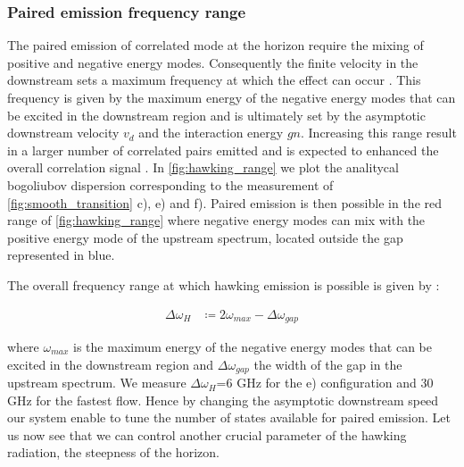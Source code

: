 \subsubsection{Paired emission frequency range}

The paired emission of correlated mode at the horizon require the mixing of positive and negative energy modes. Consequently the finite velocity in the downstream 
sets a maximum frequency at which the effect can occur \cite{jacquet_hawking_2019}. This frequency is given by the maximum energy of the negative energy modes that can be excited in the downstream region and is ultimately 
set by the asymptotic downstream velocity $v_d$ and the interaction energy $gn$. Increasing this range result in a larger number of correlated pairs emitted and is expected to enhanced
the overall correlation signal \cite{jacquet_hawking_2019}. 
In \autoref{fig:hawking_range} we plot the analitycal bogoliubov dispersion corresponding to the measurement of \autoref{fig:smooth_transition} c), e) and f).  Paired emission is then possible in the red range of \autoref{fig:hawking_range}  where negative energy modes
can mix with the positive energy mode of the upstream spectrum, located outside the gap represented in blue.

The overall frequency range at which hawking emission is possible is given by :

\begin{equation}
    \begin{align}
    \Delta \omega_H& \coloneqq  2\omega_{max}- \Delta\omega_{gap}
    \end{align}  
    \label{eq:hawking_range}
\end{equation}

where $\omega_{max}$ is the maximum energy of the negative energy modes that can be excited in the downstream region and $\Delta\omega_{gap}$ the width 
of the gap in the upstream spectrum. We measure $\Delta \omega_H$=6 GHz for the e) configuration and 30 GHz for the fastest flow. 
Hence by changing the asymptotic downstream speed our system enable to tune the number of states available for paired emission. Let us now 
see that we can control another crucial parameter of the hawking radiation, the steepness of the horizon.

